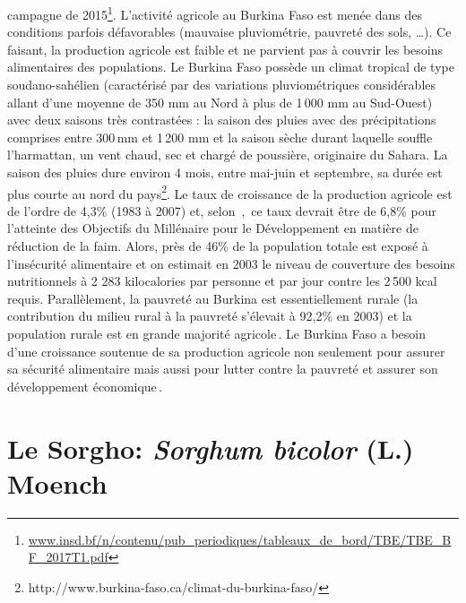 \documentclass[a4paper,11pt]{article}
\begin{document}
campagne de
2015\footnote{\url{www.insd.bf/n/contenu/pub_periodiques/tableaux_de_bord/TBE/TBE_BF_2017T1.pdf}}. L'activité
agricole au Burkina Faso est menée dans des conditions parfois
défavorables (mauvaise pluviométrie, pauvreté des sols, \ldots{}). Ce
faisant, la production agricole est faible et ne parvient pas à
couvrir les besoins alimentaires des populations. Le Burkina Faso
possède un climat tropical de type soudano-sahélien (caractérisé par
des variations pluviométriques considérables allant d'une moyenne de
350 mm au Nord à plus de 1\,000 mm au Sud-Ouest) avec deux saisons
très contrastées : la saison des pluies avec des précipitations
comprises entre 300\,mm et 1\,200 mm et la saison sèche durant
laquelle souffle l'harmattan, un vent chaud, sec et chargé de
poussière, originaire du Sahara. La saison des pluies dure environ 4
mois, entre mai-juin et septembre, sa durée est plus courte au nord du
pays\footnote{http://www.burkina-faso.ca/climat-du-burkina-faso/}. Le
taux de croissance de la production agricole est de l'ordre de 4,3\%
(1983 à 2007) et, selon
\,\citeauthor{Ngaido_2006},\,\citeyear{Ngaido_2006} ce taux devrait
être de 6,8\% pour l'atteinte des Objectifs du Millénaire pour le
Développement en matière de réduction de la faim. Alors, près de 46\%
de la population totale est exposé à l'insécurité alimentaire et on
estimait en 2003 le niveau de couverture des besoins nutritionnels à 2
283 kilocalories par personne et par jour contre les 2\,500 kcal
requis. Parallèlement, la pauvreté au Burkina est essentiellement
rurale (la contribution du milieu rural à la pauvreté s'élevait à
92,2\% en 2003) et la population rurale est en grande majorité
agricole\,\cite{DPSAA_2011}. Le Burkina Faso a besoin d'une croissance
soutenue de sa production agricole non seulement pour assurer sa
sécurité alimentaire mais aussi pour lutter contre la pauvreté et
assurer son développement
économique\,\cite{Koulibi_FideleZONGO}.

\section{Le Sorgho: \emph{Sorghum bicolor} (L.) Moench}



\end{document}
